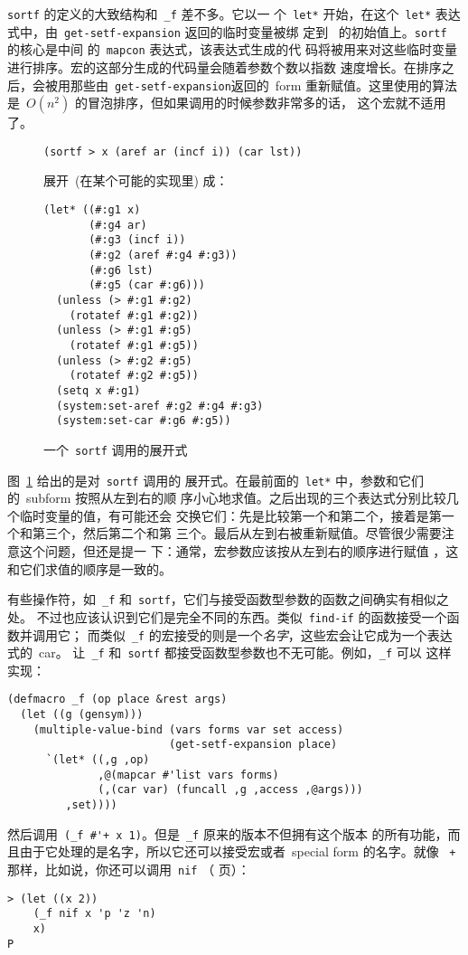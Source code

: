 \verb|sortf| 的定义的大致结构和~\verb|_f| 差不多。它以一
个~\verb|let*| 开始，在这个~\verb|let*| 表达式中，由~\verb|get-setf-expansion| 返回的临时变量被绑
定到~\gv{} 的初始值上。\verb|sortf| 的核心是中间
的~\verb|mapcon| 表达式，该表达式生成的代
码将被用来对这些临时变量进行排序。宏的这部分生成的代码量会随着参数个数以指数
速度增长。在排序之后，\gv{}会被用那些由~\verb|get-setf-expansion|返回的~form 
重新赋值。这里使用的算法是~$O(n^2)$ 的冒泡排序，但如果调用的时候参数非常多的话，
这个宏就不适用了。

\begin{figure}
\begin{lstlisting}
(sortf > x (aref ar (incf i)) (car lst))
\end{lstlisting}
展开~(在某个可能的实现里) 成：
\begin{lstlisting}
(let* ((#:g1 x)
       (#:g4 ar)
       (#:g3 (incf i))
       (#:g2 (aref #:g4 #:g3))
       (#:g6 lst)
       (#:g5 (car #:g6)))
  (unless (> #:g1 #:g2)
    (rotatef #:g1 #:g2))
  (unless (> #:g1 #:g5)
    (rotatef #:g1 #:g5))
  (unless (> #:g2 #:g5)
    (rotatef #:g2 #:g5))
  (setq x #:g1)
  (system:set-aref #:g2 #:g4 #:g3)
  (system:set-car #:g6 #:g5))
\end{lstlisting}
  \caption{一个~\texttt{sortf} 调用的展开式}
  \label{fig:expansion_of_a_call_to_sortf}
\end{figure}

图~\ref{fig:expansion_of_a_call_to_sortf} 给出的是对~\verb|sortf| 调用的
展开式。在最前面的~\verb|let*| 中，参数和它们的~subform 按照从左到右的顺
序小心地求值。之后出现的三个表达式分别比较几个临时变量的值，有可能还会
交换它们：先是比较第一个和第二个，接着是第一个和第三个，然后第二个和第
三个。最后\gv{}从左到右被重新赋值。尽管很少需要注意这个问题，但还是提一
下：通常，宏参数应该按从左到右的顺序进行赋值 ，这和它们求值的顺序是一致的。

有些操作符，如~\verb|_f| 和~\verb|sortf|，它们与接受函数型参数的函数之间确实有相似之处。
不过也应该认识到它们是完全不同的东西。类似~\verb|find-if| 的函数接受一个函数并调用它；
而类似~\verb|_f| 的宏接受的则是一个\emph{名字}，这些宏会让它成为一个表达式的~car。
让~\verb|_f| 和~\verb|sortf| 都接受函数型参数也不无可能。例如，\verb|_f| 可以
这样实现：
\begin{lstlisting}
(defmacro _f (op place &rest args)
  (let ((g (gensym)))
    (multiple-value-bind (vars forms var set access)
                         (get-setf-expansion place)
      `(let* ((,g ,op)
              ,@(mapcar #'list vars forms)
              (,(car var) (funcall ,g ,access ,@args)))
         ,set))))
\end{lstlisting}
然后调用~\verb|(_f #'+ x 1)|。但是~\verb|_f| 原来的版本不但拥有这个版本
的所有功能，而且由于它处理的是名字，所以它还可以接受宏或者~special form 的名字。就像
~\verb|+| 那样，比如说，你还可以调用~\verb|nif|
（\pageref{fig:macros_for_conditional_evaluation} 页）：
\begin{lstlisting}
> (let ((x 2))
    (_f nif x 'p 'z 'n)
    x)
P
\end{lstlisting}

